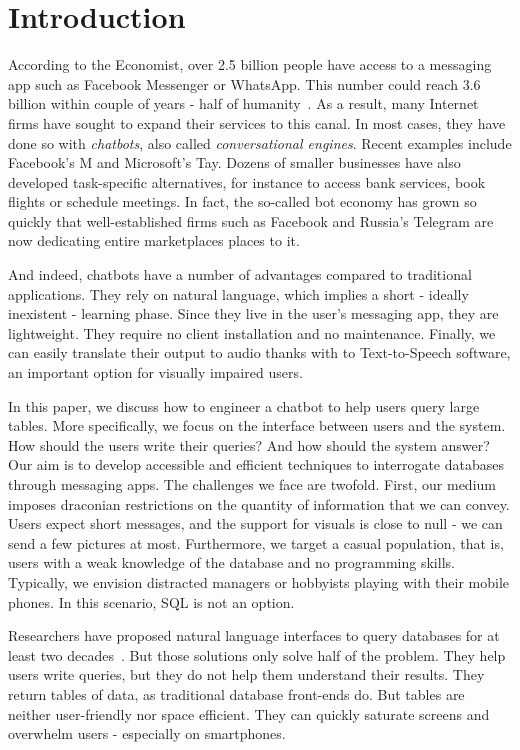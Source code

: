 \section{Introduction}
\label{sec:intro}

According to the Economist, over 2.5 billion people have access to a messaging
app such as Facebook Messenger or WhatsApp. This number could reach 3.6 billion
within couple of years - half of humanity~\cite{economist}. As a result, many 
Internet firms have sought to expand their services to this canal.  In most
cases, they have done so with \emph{chatbots}, also called \emph{conversational
engines}.  Recent examples include Facebook's M and Microsoft's Tay.
Dozens of smaller businesses have also developed task-specific
alternatives, for instance to access bank services, book flights or schedule
meetings. In fact, the so-called bot economy has grown so quickly that
well-established firms such as Facebook and Russia's Telegram are now
dedicating entire marketplaces places to it. 

And indeed, chatbots have a number of advantages compared to traditional
applications. They rely on natural language, which implies a short - ideally
inexistent - learning phase.  Since they live in the user's messaging app, they
are lightweight.  They require no client installation and no maintenance.
Finally, we can easily translate their output to audio thanks with to
Text-to-Speech software, an important option for visually impaired users.

In this paper, we discuss how to engineer a chatbot to help users query large
tables.  More specifically, we focus on the interface between users and the
system. How should the users write their queries? And how should the system
answer? Our aim is to develop accessible and efficient techniques to
interrogate databases through messaging apps.  The challenges we face are
twofold. First, our medium imposes draconian restrictions on the quantity of
information that we can convey. Users expect short messages, and the support
for visuals is close to null - we can send a few pictures at most.
Furthermore, we target a casual population, that is, users with a weak
knowledge of the database and no programming skills.  Typically, we envision
distracted managers or hobbyists playing with their mobile phones.  In this
scenario, SQL is not an option.

Researchers have proposed natural language interfaces to query databases for at
least two decades~\cite{androutsopoulos1995natural, li2014constructing}. But
those solutions only solve half of the problem. They help users write queries,
but they do not help them understand their results.  They return tables of
data, as traditional database front-ends do.  But tables are neither
user-friendly nor space efficient. They can quickly saturate screens and overwhelm
users - especially on smartphones.

